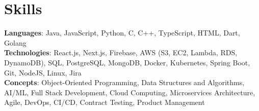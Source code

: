\documentclass[letterpaper,11pt]{article}
\begin{document}
\section{Skills}
 \begin{itemize}[leftmargin=0.15in, label={}]
    \small{\item{
     \textbf{Languages}{: Java, JavaScript, Python, C, C++, TypeScript, HTML, Dart, Golang} \\
     \textbf{Technologies}{: React.js, Next.js, Firebase, AWS (S3, EC2, Lambda, RDS, DynamoDB), SQL, PostgreSQL, MongoDB, Docker, Kubernetes, Spring Boot, Git, NodeJS, Linux, Jira} \\
     \textbf{Concepts}{: Object-Oriented Programming, Data Structures and Algorithms, AI/ML, Full Stack Development, Cloud Computing, Microservices Architecture, Agile, DevOps, CI/CD, Contract Testing, Product Management} }}
 \end{itemize}
 
%
\end{document}
